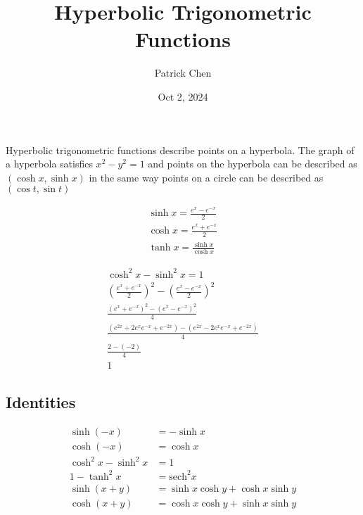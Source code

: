 \documentclass{article}
\title{Hyperbolic Trigonometric Functions}
\author{Patrick Chen}
\date{Oct 2, 2024}
\theoremstyle{mytheoremstyle}
\theoremstyle{mytheoremstyle}
\theoremstyle{myproblemstyle}
\newcommand{\sech}{\text{sech}}
\begin{document}
    \maketitle
    Hyperbolic trigonometric functions describe points on a hyperbola. The graph
    of a hyperbola satisfies $x^2-y^2=1$ and points on the hyperbola can be
    described as $(\cosh x, \sinh x)$ in the same way points on a circle can be
    described as $(\cos t, \sin t)$

    \begin{align*}
        \sinh x = \frac{e^x-e^{-x}}{2} \\
        \cosh x = \frac{e^x+e^{-x}}{2} \\
        \tanh x = \frac{\sinh x}{\cosh x}
    \end{align*}

    \begin{align*}
        \cosh^2x - \sinh^2x = 1 \\
        (\frac{e^x+e^{-x}}{2})^2 - (\frac{e^x-e^{-x}}{2})^2 \\
        \frac{(e^x+e^{-x})^2 - (e^x-e^{-x})^2}{4} \\
        \frac{(e^{2x} + 2e^xe^{-x} +e^{-2x}) - (e^{2x} - 2e^xe^{-x} +e^{-2x})}{4} \\
        \frac{2-(-2)}{4} \\
        1
    \end{align*}

    \subsection*{Identities}
    \begin{align*}
        \sinh(-x)               &= -\sinh x \\
        \cosh(-x)               &= \cosh x \\
        \cosh^2 x - \sinh^2 x   &= 1 \\
        1-\tanh^2 x             &= \sech^2 x \\
        \sinh(x+y)              &= \sinh x \cosh y + \cosh x \sinh y \\
        \cosh(x+y)              &= \cosh x \cosh y + \sinh x \sinh y
    \end{align*}
\end{document}
